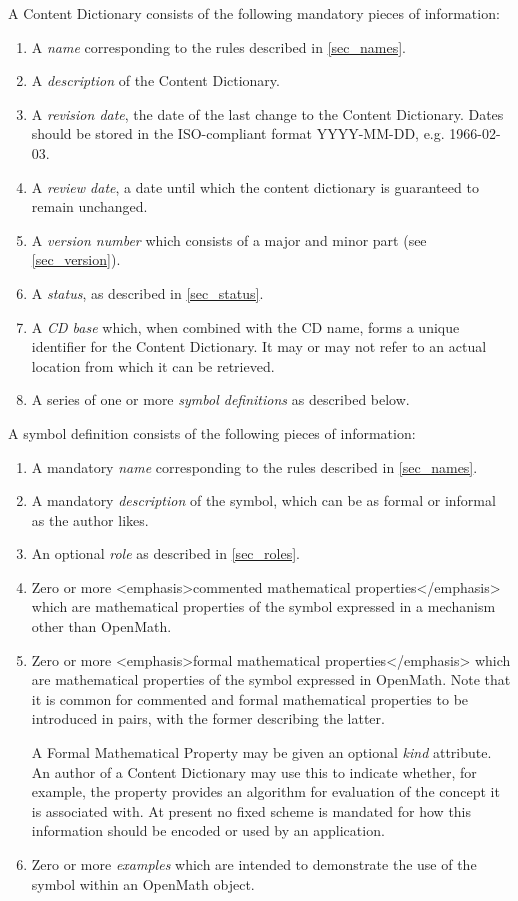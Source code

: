 \documentclass{report}
\def\OM{OpenMath\xspace}
\begin{document}
A Content Dictionary consists of the following mandatory pieces of information:
\begin{enumerate}
\item A \emph{name} corresponding to the rules described in \ref{sec_names}.
\item A \emph{description} of the Content Dictionary.
\item A \emph{revision date}, the date of the last change to the Content Dictionary.
  Dates should be stored in the ISO-compliant format YYYY-MM-DD, e.g. 1966-02-03.
\item A \emph{review date}, a date until which the content dictionary is guaranteed to
  remain unchanged.
\item A \emph{version number} which consists of a major and minor part (see
  \ref{sec_version}).
\item A \emph{status}, as described in \ref{sec_status}.
\item A \emph{CD base} which, when combined with the CD name, forms a unique identifier
  for the Content Dictionary. It may or may not refer to an actual location from which it
  can be retrieved.
\item A series of one or more \emph{symbol definitions} as described below.
\end{enumerate}
A symbol definition consists of the following pieces of information:
\begin{enumerate}
\item A mandatory \emph{name} corresponding to the rules described in \ref{sec_names}.
\item A mandatory \emph{description} of the symbol, which can be as formal or informal as
  the author likes.
\item An optional \emph{role} as described in \ref{sec_roles}.
\item Zero or more <emphasis>commented mathematical properties</emphasis> which are
  mathematical properties of the symbol expressed in a mechanism other than \OM.
\item Zero or more <emphasis>formal mathematical properties</emphasis> which are
  mathematical properties of the symbol expressed in \OM.  Note that it is common for
  commented and formal mathematical properties to be introduced in pairs, with the former
  describing the latter.
	  
  A Formal Mathematical Property may be given an optional \emph{kind} attribute.  An
  author of a Content Dictionary may use this to indicate whether, for example, the
  property provides an algorithm for evaluation of the concept it is associated with.  At
  present no fixed scheme is mandated for how this information should be encoded or used
  by an application.
\item Zero or more \emph{examples} which are intended to demonstrate the use of the symbol
  within an \OM object.
\end{enumerate}
\end{document}

